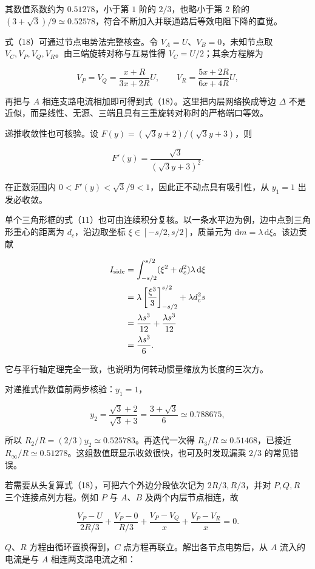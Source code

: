 \documentclass[12pt,a4paper,UTF8]{ctexart}
\begin{document}
其数值系数约为 \(0.51278\)，小于第 \(1\) 阶的 \(2/3\)，也略小于第 \(2\)
阶的
\((3+\sqrt3)/9\simeq0.52578\)，符合不断加入并联通路后等效电阻下降的直觉。

式（18）可通过节点电势法完整核查。令 \(V_A=U\)、\(V_B=0\)，未知节点取
\(V_C,V_P,V_Q,V_R\)。由三端旋转对称与互易性得 \(V_C=U/2\)；其余方程解为

\[
V_P=V_Q=\frac{x+R}{3x+2R}U,\qquad
V_R=\frac{5x+2R}{6x+4R}U,
\]

再把与 \(A\) 相连支路电流相加即可得到式（18）。这里把内层网络换成等边
\(\Delta\)
不是近似，而是线性、无源、三端且具有三重旋转对称时的严格端口等效。

递推收敛性也可核验。设 \(F(y)=(\sqrt3y+2)/(\sqrt3y+3)\)，则

\[
F'(y)=\frac{\sqrt3}{(\sqrt3y+3)^2}.
\]

在正数范围内 \(0<F'(y)<\sqrt3/9<1\)，因此正不动点具有吸引性，从
\(y_1=1\) 出发必收敛。

单个三角形框的式（11）也可由连续积分复核。以一条水平边为例，边中点到三角形重心的距离为
\(d_c\)，沿边取坐标 \(\xi\in[-s/2,s/2]\)，质量元为
\(\mathrm dm=\lambda\,\mathrm d\xi\)。该边贡献

\[
\begin{aligned}
I_{\rm side}
&=\int_{-s/2}^{s/2}(\xi^2+d_c^2)\lambda\,\mathrm d\xi\\
&=\lambda\left[\frac{\xi^3}{3}\right]_{-s/2}^{s/2}
+\lambda d_c^2s\\
&=\frac{\lambda s^3}{12}+\frac{\lambda s^3}{12}\\
&=\frac{\lambda s^3}{6}.
\end{aligned}
\]

它与平行轴定理完全一致，也说明为何转动惯量缩放为长度的三次方。

对递推式作数值前两步核验：\(y_1=1\)，

\[
y_2=\frac{\sqrt3+2}{\sqrt3+3}
=\frac{3+\sqrt3}{6}\simeq0.788675,
\]

所以 \(R_2/R=(2/3)y_2\simeq0.525783\)。再迭代一次得
\(R_3/R\simeq0.51468\)，已接近
\(R_\infty/R\simeq0.51278\)。这组数值既显示收敛很快，也可及时发现漏乘
\(2/3\) 的常见错误。

若需要从头复算式（18），可把六个外边分段依次记为 \(2R/3,R/3\)，并对
\(P,Q,R\) 三个连接点列方程。例如 \(P\) 与 \(A\)、\(B\)
及两个内层节点相连，故

\[
\frac{V_P-U}{2R/3}
+\frac{V_P-0}{R/3}
+\frac{V_P-V_Q}{x}
+\frac{V_P-V_R}{x}=0.
\]

\(Q\)、\(R\) 方程由循环置换得到，\(C\)
点方程再联立。解出各节点电势后，从 \(A\) 流入的电流是与 \(A\)
相连两支路电流之和：
\end{document}
